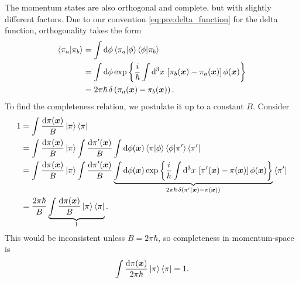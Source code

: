 The momentum states are also orthogonal and complete, but with slightly different factors.
Due to our convention \eqref{eq:pre:delta_function} for the delta function, orthogonality takes the form
\begin{equation}
\begin{split}
	\braket{\pi_a | \pi_b} &= \int \mathop{}\!\mathrm{d} \phi \braket{\pi_a | \phi} \braket{\phi | \pi_b} \\
	                       &= \int \mathop{}\!\mathrm{d} \phi \exp \left\{ \frac{i}{\hbar} \int \mathop{}\!\mathrm{d}^3 x \, \left[ \pi_b({\bm{x}}) - \pi_a({\bm{x}}) \right] \phi({\bm{x}}) \right\} \\
						   &= 2 \pi \hbar \, \delta \left( \pi_a({\bm{x}}) - \pi_b({\bm{x}}) \right) .
\end{split}
\end{equation}
To find the completeness relation, we postulate it up to a constant $B$.
Consider
\begin{equation}
\begin{split}
	1 &= \int \frac{\dif \pi(\vec{x})}{B} \ket{\pi} \bra{\pi} \\
	  &= \int \frac{\dif \pi(\vec{x})}{B} \ket{\pi} \int \frac{\dif \pi'(\vec{x})}{B} \int \dif \phi(\vec{x}) \braket{\pi | \phi} \braket{\phi | \pi'} \bra{\pi'} \\
	  &= \int \frac{\dif \pi(\vec{x})}{B} \ket{\pi} \int \frac{\dif \pi'(\vec{x})}{B} \underbrace{\int \dif \phi(\vec{x}) \exp \left\{ \frac{i}{\hbar} \int \dif^3 x \, \left[ \pi'(\vec{x}) - \pi(\vec{x}) \right] \phi(\vec{x}) \right\}}_{2 \pi \hbar \, \delta \left( \pi'(\vec{x}) - \pi(\vec{x}) \right)} \bra{\pi'} \\
	  &= \frac{2 \pi \hbar}{B} \underbrace{\int \frac{\dif \pi(\vec{x})}{B} \ket{\pi} \bra{\pi}}_{1} .
\end{split}
\end{equation}
This would be inconsistent unless $B = 2 \pi \hbar$, so completeness in momentum-space is
\begin{equation}
	\int \frac{\mathop{}\!\mathrm{d} \pi({\bm{x}})}{2 \pi \hbar} \ket{\pi} \bra{\pi} = 1 .
\end{equation}

